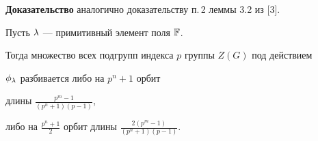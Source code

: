 {\bf Доказательство} аналогично доказательству п.\,2 леммы 3.2 из [3].








\begin{lem}


Пусть $\lambda$ --- примитивный элемент поля $\Bbb F$. 


Тогда множество всех подгрупп индекса $p$ группы $Z(G)$ под действием


$\phi_\lambda$ разбивается либо на $p^n+1$ орбит


длины $\frac{p^m-1}{(p^n+1)(p-1)}$,


либо на $\frac{p^n+1}{2}$ орбит длины $\frac{2(p^m-1)}{(p^n+1)(p-1)}$.


\end{lem}





